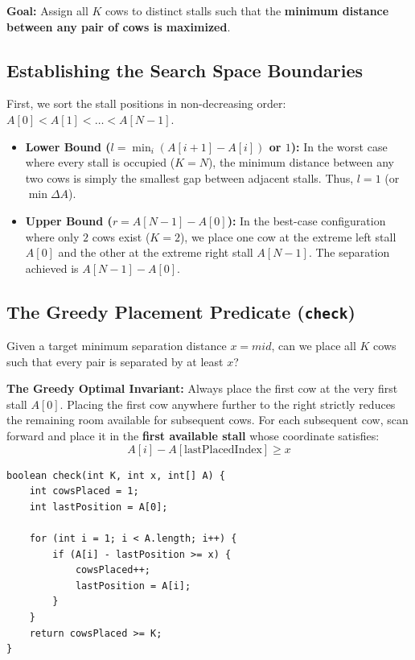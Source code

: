 \documentclass[10pt,journal,compsoc,onecolumn]{IEEEtran}
\begin{document}
\textbf{Goal:} Assign all $K$ cows to distinct stalls such that the \textbf{minimum distance between any pair of cows is maximized}.

\subsection{Establishing the Search Space Boundaries}

First, we sort the stall positions in non-decreasing order: $A[0] < A[1] < \dots < A[N-1]$.

\begin{itemize}
    \item \textbf{Lower Bound ($l = \min_{i} (A[i+1] - A[i])$ or $1$):}
    In the worst case where every stall is occupied ($K = N$), the minimum distance between any two cows is simply the smallest gap between adjacent stalls. Thus, $l = 1$ (or $\min \Delta A$).
    \item \textbf{Upper Bound ($r = A[N-1] - A[0]$):}
    In the best-case configuration where only $2$ cows exist ($K = 2$), we place one cow at the extreme left stall $A[0]$ and the other at the extreme right stall $A[N-1]$. The separation achieved is $A[N-1] - A[0]$.
\end{itemize}

\subsection{The Greedy Placement Predicate (\texttt{check})}

Given a target minimum separation distance $x = mid$, can we place all $K$ cows such that every pair is separated by at least $x$?

\textbf{The Greedy Optimal Invariant:} Always place the first cow at the very first stall $A[0]$. Placing the first cow anywhere further to the right strictly reduces the remaining room available for subsequent cows. For each subsequent cow, scan forward and place it in the \textbf{first available stall} whose coordinate satisfies:
\[
A[i] - A[\text{lastPlacedIndex}] \ge x
\]

{\small
\begin{verbatim}
boolean check(int K, int x, int[] A) {
    int cowsPlaced = 1;
    int lastPosition = A[0];

    for (int i = 1; i < A.length; i++) {
        if (A[i] - lastPosition >= x) {
            cowsPlaced++;
            lastPosition = A[i];
        }
    }
    return cowsPlaced >= K;
}
\end{verbatim}
}
\end{document}
